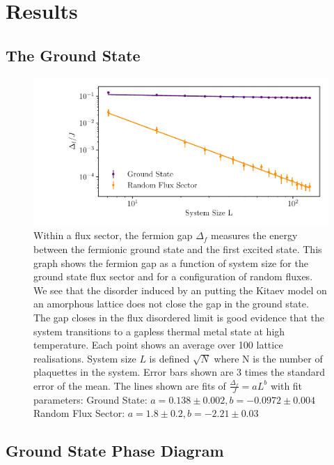 \hypertarget{results}{%
\section{Results}\label{results}}

\hypertarget{the-ground-state}{%
\subsection{The Ground State}\label{the-ground-state}}

\begin{figure}
\hypertarget{fig:fermion_gap_vs_L}{%
\centering
\includegraphics[width=1\textwidth,height=\textheight]{figure_code/amk_chapter/results/fermion_gap_vs_L/fermion_gap_vs_L.pdf}
\caption{Within a flux sector, the fermion gap \(\Delta_f\) measures the
energy between the fermionic ground state and the first excited state.
This graph shows the fermion gap as a function of system size for the
ground state flux sector and for a configuration of random fluxes. We
see that the disorder induced by an putting the Kitaev model on an
amorphous lattice does not close the gap in the ground state. The gap
closes in the flux disordered limit is good evidence that the system
transitions to a gapless thermal metal state at high temperature. Each
point shows an average over 100 lattice realisations. System size \(L\)
is defined \(\sqrt{N}\) where N is the number of plaquettes in the
system. Error bars shown are \(3\) times the standard error of the mean.
The lines shown are fits of \(\tfrac{\Delta_f}{J} = aL ^ b\) with fit
parameters: Ground State: \(a = 0.138 \pm 0.002, b = -0.0972 \pm 0.004\)
Random Flux Sector:
\(a = 1.8 \pm 0.2, b = -2.21 \pm 0.03\)}\label{fig:fermion_gap_vs_L}
}
\end{figure}

\hypertarget{ground-state-phase-diagram}{%
\subsection{Ground State Phase
Diagram}\label{ground-state-phase-diagram}}


